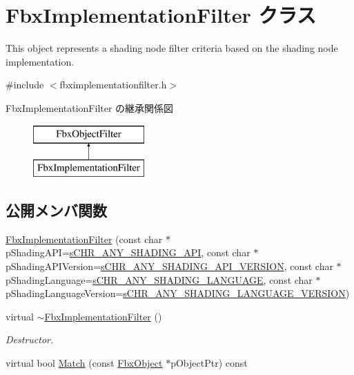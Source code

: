 \hypertarget{class_fbx_implementation_filter}{}\section{Fbx\+Implementation\+Filter クラス}
\label{class_fbx_implementation_filter}


This object represents a shading node filter criteria based on the shading node implementation.  




{\ttfamily \#include $<$fbximplementationfilter.\+h$>$}

Fbx\+Implementation\+Filter の継承関係図\begin{figure}[H]
\begin{center}
\leavevmode
\includegraphics[height=2.000000cm]{class_fbx_implementation_filter}
\end{center}
\end{figure}
\subsection*{公開メンバ関数}
\begin{DoxyCompactItemize}
\item 
\hyperlink{class_fbx_implementation_filter_ab53b0ef25ada946751aaa8df6490809b}{Fbx\+Implementation\+Filter} (const char $\ast$p\+Shading\+A\+PI=\hyperlink{class_fbx_implementation_filter_a596d1d4050df2c9a608520ee6dd6bdfd}{s\+C\+H\+R\+\_\+\+A\+N\+Y\+\_\+\+S\+H\+A\+D\+I\+N\+G\+\_\+\+A\+PI}, const char $\ast$p\+Shading\+A\+P\+I\+Version=\hyperlink{class_fbx_implementation_filter_ac81682276ccaaf912fa5795b1b90110d}{s\+C\+H\+R\+\_\+\+A\+N\+Y\+\_\+\+S\+H\+A\+D\+I\+N\+G\+\_\+\+A\+P\+I\+\_\+\+V\+E\+R\+S\+I\+ON}, const char $\ast$p\+Shading\+Language=\hyperlink{class_fbx_implementation_filter_a682a04bbd0db2b4ff00e13cecb27badc}{s\+C\+H\+R\+\_\+\+A\+N\+Y\+\_\+\+S\+H\+A\+D\+I\+N\+G\+\_\+\+L\+A\+N\+G\+U\+A\+GE}, const char $\ast$p\+Shading\+Language\+Version=\hyperlink{class_fbx_implementation_filter_af479f36e72bb5dd80c400edbab0ceafe}{s\+C\+H\+R\+\_\+\+A\+N\+Y\+\_\+\+S\+H\+A\+D\+I\+N\+G\+\_\+\+L\+A\+N\+G\+U\+A\+G\+E\+\_\+\+V\+E\+R\+S\+I\+ON})
\item 
virtual \hyperlink{class_fbx_implementation_filter_a21f8f8c4176a19d38ed1280adc1d104b}{$\sim$\+Fbx\+Implementation\+Filter} ()
\begin{DoxyCompactList}\small\item\em Destructor. \end{DoxyCompactList}\item 
virtual bool \hyperlink{class_fbx_implementation_filter_a59ab32592ea71f1853f1cc5f641a341d}{Match} (const \hyperlink{class_fbx_object}{Fbx\+Object} $\ast$p\+Object\+Ptr) const
\end{DoxyCompactItemize}

